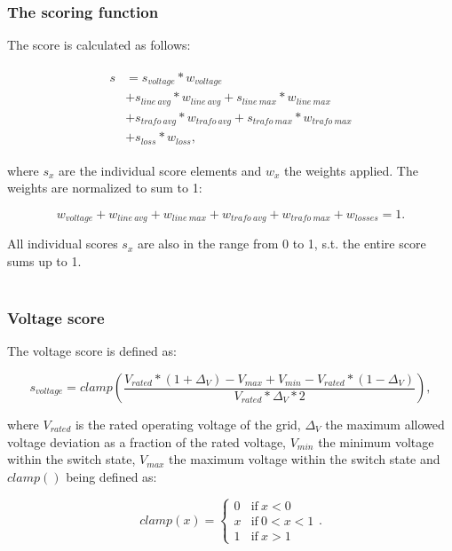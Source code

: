 \subsubsection{The scoring function}

The score is calculated as follows:

\begin{align}
    \begin{split}
        s &= s_{voltage} * w_{voltage}\\
        &+ s_{line \ avg} * w_{line \ avg} + s_{line \ max} * w_{line \ max}\\
        & + s_{trafo \ avg} * w_{trafo \ avg} + s_{trafo \ max} * w_{trafo \ max}\\
        & + s_{loss} * w_{loss},
    \end{split}
    \label{eq:score}
\end{align}

where $s_x$ are the individual score elements and $w_x$ the weights
applied. The weights are normalized to sum to 1:

\begin{equation}
    w_{voltage} + w_{line \ avg} + w_{line \ max} + w_{trafo \ avg} + w_{trafo \ max} + w_{losses} = 1.
\end{equation}

All individual scores $s_x$ are also in the range from 0 to 1, s.t. the
entire score sums up to 1.\\
\\

\subsubsection{Voltage score}

The voltage score is defined as:

\begin{equation}
    s_{voltage} = clamp(\frac{V_{rated}*(1+\Delta_{V}) - V_{max}
                +       V_{min} - V_{rated}*(1-\Delta_{V})}
                {{V_{rated}*\Delta_{V}}*2}),
                \label{eq:score:voltage}
\end{equation}

where $V_{rated}$ is the rated operating voltage of the grid, $\Delta_V$ the maximum allowed
voltage deviation as a fraction of the rated voltage, $V_{min}$ the minimum voltage  within
the switch state, $V_{max}$ the maximum voltage within the switch state and $clamp()$ being
defined as:

\begin{equation}
    clamp(x) =
    \begin{cases}
        0 & \text{if} \ x < 0\\
        x & \text{if} \ 0 < x < 1\\
        1 & \text{if} \ x > 1
    \end{cases}.
\end{equation}


